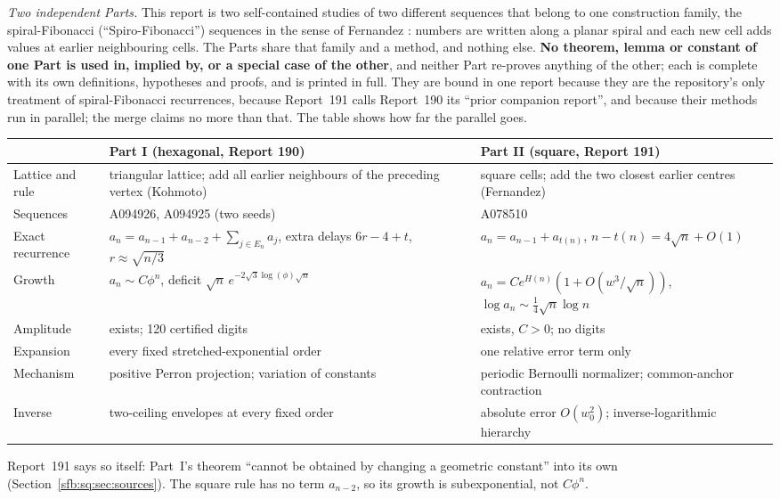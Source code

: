 \documentclass[11pt]{article}
\theoremstyle{remark}\newtheorem{remark}[theorem]{Remark}
\begin{document}
\emph{Two independent Parts.} This report is two self-contained studies of
two different sequences that belong to one construction family, the
spiral-Fibonacci (``Spiro-Fibonacci'') sequences in the sense of Fernandez
\cite{fernandez}: numbers are written along a planar spiral and each new
cell adds values at earlier neighbouring cells. The Parts share that family
and a method, and nothing else. \textbf{No theorem, lemma or constant of one
Part is used in, implied by, or a special case of the other}, and neither
Part re-proves anything of the other; each is complete with its own
definitions, hypotheses and proofs, and is printed in full. They are bound
in one report because they are the repository's only treatment of
spiral-Fibonacci recurrences, because Report~191 calls Report~190 its ``prior
companion report'', and because their methods run in parallel; the merge
claims no more than that. The table shows how far the parallel goes.
\begin{center}
\small
\begin{tabular}{@{}>{\raggedright\arraybackslash}p{}>{\raggedright\arraybackslash}p{}>{\raggedright\arraybackslash}p{}@{}}
\toprule
& Part I (hexagonal, Report 190) & Part II (square, Report 191)\\
\midrule
Lattice and rule & triangular lattice; add all earlier neighbours of the preceding vertex (Kohmoto) & square cells; add the two closest earlier centres (Fernandez)\\
Sequences & A094926, A094925 (two seeds) & A078510\\
Exact recurrence & $a_n=a_{n-1}+a_{n-2}+\sum_{j\in E_n}a_j$, extra delays $6r-4+t$, $r\approx\sqrt{n/3}$ & $a_n=a_{n-1}+a_{t(n)}$, $n-t(n)=4\sqrt n+O(1)$\\
Growth & $a_n\sim C\phi^n$, deficit $\sqrt n\,e^{-2\sqrt3\log(\phi)\sqrt n}$ & $a_n=Ce^{H(n)}(1+O(w^3/\sqrt n))$, $\log a_n\sim\frac14\sqrt n\log n$\\
Amplitude & exists; 120 certified digits & exists, $C>0$; no digits\\
Expansion & every fixed stretched-exponential order & one relative error term only\\
Mechanism & positive Perron projection; variation of constants & periodic Bernoulli normalizer; common-anchor contraction\\
Inverse & two-ceiling envelopes at every fixed order & absolute error $O(w_0^2)$; inverse-logarithmic hierarchy\\
\bottomrule
\end{tabular}
\end{center}
Report~191 says so itself: Part~I's theorem ``cannot be obtained by changing
a geometric constant'' into its own (Section~\ref{sfb:sq:sec:sources}). The
square rule has no term $a_{n-2}$, so its growth is subexponential, not
$C\phi^n$.
\end{document}
